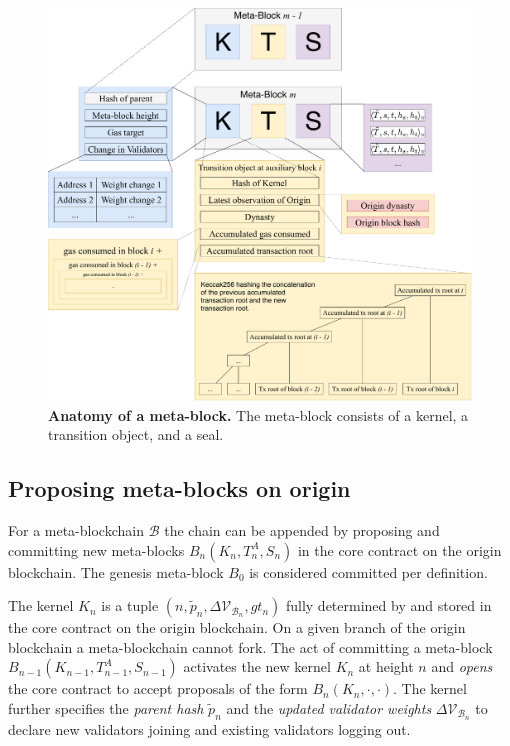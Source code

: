 \documentclass[12pt,a4paper]{article}
\begin{document}
\begin{figure}
    \centering
	\includegraphics[width=\textwidth]{meta_block}
	\caption{\textbf{Anatomy of a meta-block.}
		The meta-block consists of a kernel, a transition object, and a seal.
	}
	\label{fig:meta_block}
\end{figure}

\subsection{Proposing meta-blocks on origin}
\label{proposing_metablocks}

For a meta-blockchain $\mathcal{B}$ the chain can be appended by proposing and committing new meta-blocks $B_n(K_n, T^A_n, S_n)$ in the core contract on the origin block\-chain.
The genesis meta-block $B_0$ is considered committed per definition.

The kernel $K_n$ is a tuple $(n, \tilde{p}_n, \Delta\mathcal{V}_{\mathcal{B}_n}, gt_n)$ fully determined by and stored in the core contract on the origin blockchain. %
On a given branch of the origin blockchain a meta-blockchain cannot fork.
The act of committing a meta-block $B_{n-1}(K_{n-1}, T^A_{n-1}, S_{n-1})$ activates the new kernel $K_n$ at height $n$ and \emph{opens} the core contract to accept proposals of the form $B_n(K_n, \cdot, \cdot)$.
The kernel further specifies the \emph{parent hash} $\tilde{p}_n$ and the \emph{updated validator weights} $\Delta\mathcal{V}_{\mathcal{B}_n}$ to declare new validators joining and existing validators logging out.
\end{document}
